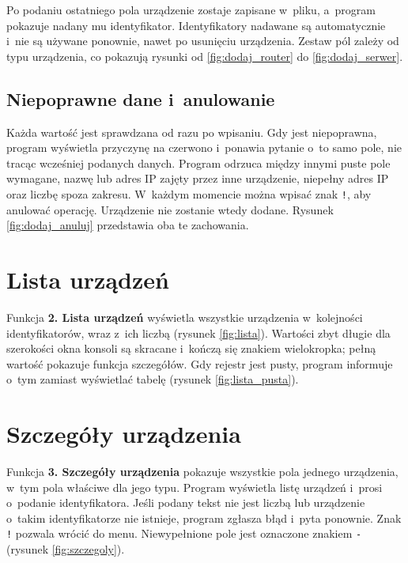 Po podaniu ostatniego pola urządzenie zostaje zapisane w~pliku, a~program pokazuje nadany mu identyfikator. Identyfikatory nadawane są automatycznie i~nie są używane ponownie, nawet po usunięciu urządzenia. Zestaw pól zależy od typu urządzenia, co pokazują rysunki od \ref{fig:dodaj_router} do \ref{fig:dodaj_serwer}.


\subsection{Niepoprawne dane i~anulowanie}

Każda wartość jest sprawdzana od razu po wpisaniu. Gdy jest niepoprawna, program wyświetla przyczynę na czerwono i~ponawia pytanie o~to samo pole, nie tracąc wcześniej podanych danych. Program odrzuca między innymi puste pole wymagane, nazwę lub adres IP zajęty przez inne urządzenie, niepełny adres IP oraz liczbę spoza zakresu. W~każdym momencie można wpisać znak \texttt{!}, aby anulować operację. Urządzenie nie zostanie wtedy dodane. Rysunek \ref{fig:dodaj_anuluj} przedstawia oba te zachowania.


\section{Lista urządzeń}

Funkcja \textbf{2. Lista urządzeń} wyświetla wszystkie urządzenia w~kolejności identyfikatorów, wraz z~ich liczbą (rysunek \ref{fig:lista}). Wartości zbyt długie dla szerokości okna konsoli są skracane i~kończą się znakiem wielokropka; pełną wartość pokazuje funkcja szczegółów. Gdy rejestr jest pusty, program informuje o~tym zamiast wyświetlać tabelę (rysunek \ref{fig:lista_pusta}).


\section{Szczegóły urządzenia}

Funkcja \textbf{3. Szczegóły urządzenia} pokazuje wszystkie pola jednego urządzenia, w~tym pola właściwe dla jego typu. Program wyświetla listę urządzeń i~prosi o~podanie identyfikatora. Jeśli podany tekst nie jest liczbą lub urządzenie o~takim identyfikatorze nie istnieje, program zgłasza błąd i~pyta ponownie. Znak \texttt{!} pozwala wrócić do menu. Niewypełnione pole jest oznaczone znakiem \texttt{-} (rysunek \ref{fig:szczegoly}).

